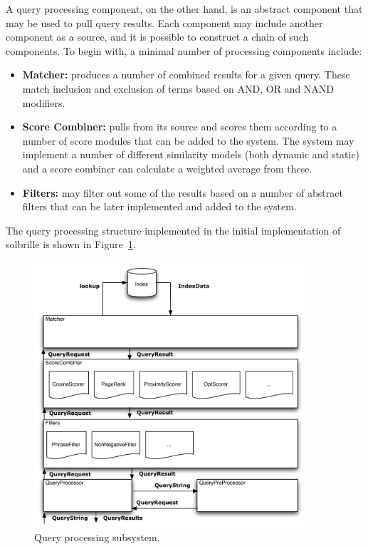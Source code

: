 A query processing component, on the other hand, is an abstract component that may be used to pull query results. Each component may include another component as a source, and it is possible to construct a chain of such components. To begin with, a minimal number of processing components include:
\begin{itemize}
	\item {\bf Matcher:} produces a number of combined results for a given query. These match inclusion and exclusion of terms based on AND, OR and NAND modifiers.
	\item {\bf Score Combiner:} pulls from its source and scores them according to a number of score modules that can be added to the system. The system may implement a number of different similarity models (both dynamic and static) and a score combiner can calculate a weighted average from these.
	\item {\bf Filters:} may filter out some of the results based on a number of abstract filters that can be later implemented and added to the system.
\end{itemize}

The query processing structure implemented in the initial implementation of solbrille is shown in Figure~\ref{fig:query_processing}.

\begin{figure}[ht]
	\centering
	\includegraphics[width=0.9\textwidth]{include/query_processing.pdf}
	\caption{Query processing subsystem.}\label{fig:query_processing}
\end{figure}

